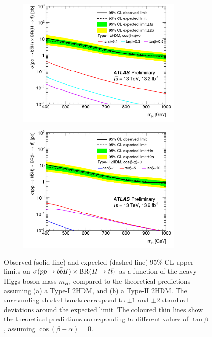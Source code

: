 \begin{figure}[t!]
\begin{subfigure}{0.5\textwidth}
  \centering
  \includegraphics[width=0.9\textwidth]{figures/VLQ/fig_21a.png}
  \caption{}
  \label{}
\end{subfigure}
\begin{subfigure}{0.5\textwidth}
  \centering
  \includegraphics[width=0.9\textwidth]{figures/VLQ/fig_21b.png}
  \caption{}
  \label{}
\end{subfigure}
\captionsetup{width=0.85\textwidth} \caption{\small Observed (solid line) and expected (dashed line) 95\% CL upper limits on $\sigma(pp \to b\bar{b}H) \times {\rm BR}(H \to t\bar{t})$ 
as a function of the heavy Higgs-boson mass $m_H$, compared to the theoretical predictions assuming (a) a Type-I 2HDM, and (b) a Type-II 2HDM.
The surrounding shaded bands correspond to $\pm1$ and $\pm2$ standard deviations around the expected limit. 
The coloured thin lines show the theoretical predictions corresponding to different values of $\tan\beta$, assuming 
$\cos(\beta-\alpha)=0$.}
\label{sec:vlq:fig:hbsm1}
\end{figure}



